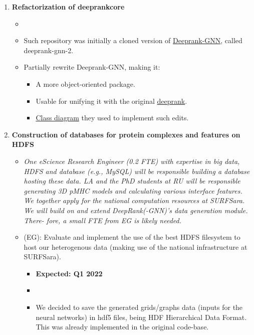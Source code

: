 \begin{enumerate}[start=0,label={\bfseries \ding{118} Task \arabic*:}]%
\item  \textbf{Refactorization of deeprankcore}
\begin{itemize}[label=]
\item {}
\item Such repository was initially a cloned version of
\href{https://github.com/DeepRank/Deeprank-GNN}{Deeprank-GNN}, called deeprank-gnn-2.
\item Partially rewrite Deeprank-GNN, making it:
\begin{itemize}
\item A more object-oriented package.
\item Usable for unifying it with the original \href{https://github.com/DeepRank/deeprank}{deeprank}.
\item \href{https://drive.google.com/file/d/17Nw5mOpYzyp3uL225OTZNCHz8QVMY2aF/view?usp=share_link}{Class diagram} they used to implement such edits.
\end{itemize}
\end{itemize}
\item \textbf{Construction of databases for protein complexes and features on HDFS}
\begin{itemize}[label=]
\item \textit{One eScience Research Engineer (0.2 FTE) with expertise in big data, HDFS and database (e.g., MySQL) will be
responsible building a database hosting these data. LA and the PhD students at RU will be responsible generating 3D
pMHC models and calculating various interface features. We together apply for the national computation resources at
SURFSara. We will build on and extend DeepRank(-GNN)'s data generation module. There- fore, a small FTE from EG is
likely needed.}
\item (EG): Evaluate and implement the use of the best HDFS filesystem to host our heterogenous data (making use of the
national infrastructure at SURFSara).
\begin{itemize}
\item \textbf{Expected: Q1 2022}
\item {}
\item We decided to save the generated grids/graphs data (inputs for the neural networks) in hdf5 files, being HDF
Hierarchical Data Format. This was already implemented in the original code-base.
\begin{itemize}

\end{itemize}
\end{itemize}
\end{itemize}
\end{enumerate}
